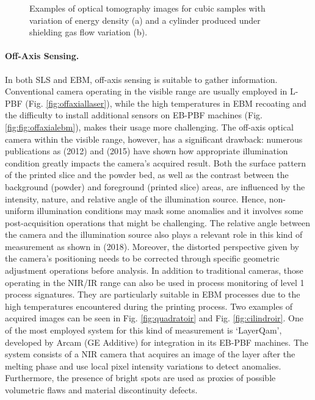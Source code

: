 \begin{figure}
{    }
    \caption[Optical tomography examples.]{Examples of optical tomography images for cubic samples with variation of energy density (a) and a cylinder produced under shielding gas flow variation (b)\cite{bamberg_-process_2016}.}
\end{figure}
\paragraph{Off-Axis Sensing.} In both SLS and EBM, off-axis sensing is suitable to gather information. Conventional camera operating in the visible range are usually employed in L-PBF (Fig. \ref{fig:offaxiallaser}), while the high temperatures in EBM recoating and the difficulty to install additional sensors on EB-PBF machines (Fig. \ref{fig:fig:offaxialebm}), makes their usage more challenging. The off-axis optical camera within the visible range, however, has a significant drawback: numerous publications as \citealt{kleszczynski_error_2012} (2012) and \citeauthor{foster_bk_optical_2015} (2015) have shown how appropriate illumination condition greatly impacts the camera's acquired result. Both the surface pattern of the printed slice and the powder bed, as well as the contrast between the background (powder) and foreground (printed slice) areas, are influenced by the intensity, nature, and relative angle of the illumination source. Hence, non-uniform illumination conditions may mask some anomalies and it involves some post-acquisition operations that might be challenging. The relative angle between the camera and the illumination source also plays a relevant role in this kind of measurement as shown in  \citeauthor{caltanissetta_characterization_2018} (2018). Moreover, the distorted perspective given by the camera's positioning needs to be corrected through specific geometric adjustment operations before analysis. In addition to traditional cameras, those operating in the NIR/IR range can also be used in process monitoring of level 1 process signatures. They are particularly suitable in EBM processes due to the high temperatures encountered during the printing process. Two examples of acquired images can be seen in Fig. \ref{fig:quadratoir} and Fig. \ref{fig:cilindroir}. One of the most employed system for this kind of measurement is ‘LayerQam’, developed by Arcam (GE Additive) for integration in its EB-PBF machines. The system consists of a NIR camera that acquires an image of the layer after the melting phase and use local pixel intensity variations to detect anomalies. Furthermore, the presence of bright spots are used as proxies of possible volumetric flaws and material discontinuity defects.
